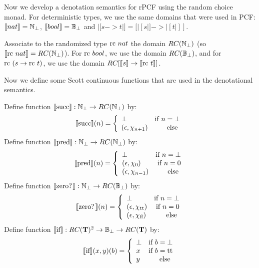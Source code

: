 Now we develop a denotation semantics for rPCF using the random choice monad.  For deterministic types, we use the same domains that were used in PCF:  $|[nat|] = \Nat_\bot$, $|[bool|] = \Bool_\bot$ and $|[s-> t|] = [|[s|]->|[t|]]$.

Associate to the randomized type $\textrm{rc } nat$ the domain $RC({\mathbb N}_\bot)$ (so $|[\rc nat|] = RC(\Nat_\bot)$).  For $\textrm{rc } bool$, we use the domain $RC({\mathbb B}_\bot)$, and for $\textrm{rc } (s-> \textrm{rc } t)$, we use the domain $RC[|[s|] -> |[\textrm{rc } t|]]$.

Now we define some Scott continuous functions that are used in the denotational semantics.
  
\noindent Define function $|[\Succ\!\!|] : \Nat_\bot -> RC(\Nat_\bot)$ by:
\begin{displaymath}
	|[\textrm{succ }\!\!|](n) = \left\{
		\begin{array}{lr}
			\bot & \textrm{if } n = \bot \\
			(\epsilon, \chi_{n+1}) & \textrm{else }
		\end{array}
	\right.		
\end{displaymath}
Define function $|[\pred\!\!|] : \Nat_\bot -> RC(\Nat_\bot)$ by:
\begin{displaymath}
	|[\textrm{pred }\!\!|](n) = \left\{
		\begin{array}{lr}
			\bot & \textrm{if } n = \bot \\
			(\epsilon, \chi_0) & \textrm{if } n = 0 \\
			(\epsilon, \chi_{n-1}) & \textrm{else }
		\end{array}
	\right.		
\end{displaymath}
Define function $|[\zero\!\!|] : \Nat_\bot -> RC(\Bool_\bot)$ by:
\begin{displaymath}
	|[\textrm{zero? }\!\!|](n) = \left\{
		\begin{array}{lr}
			\bot & \textrm{if } n = \bot \\
			(\epsilon, \chi_{\textrm{tt }\!\!}) & \textrm{if } n = 0 \\
			(\epsilon, \chi_{\textrm{ff }\!\!}) & \textrm{else }
		\end{array}
	\right.		
\end{displaymath}
Define function $|[\If\!\!|] : RC(\mathbf{T})^2 -> \Bool_\bot -> RC(\mathbf{T})$ by:
\begin{displaymath}
	|[\textrm{if }\!\!|](x,y)(b) = \left\{
		\begin{array}{lr}
			\bot & \textrm{if } b = \bot \\
			x & \textrm{if } b = \textrm{tt }\!\! \\
			y & \textrm{else }
		\end{array}
	\right.		
\end{displaymath}
